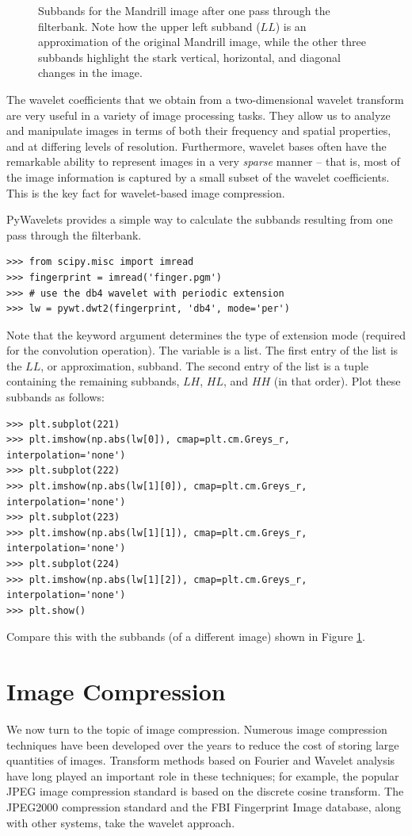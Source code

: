 \begin{figure}
\begin{subfigure}{0.4\textwidth}
       \end{subfigure}
    \caption{Subbands for the Mandrill image after one pass through the filterbank.
    Note how the upper left subband ($LL$) is an approximation of the original Mandrill image, while the other
    three subbands highlight the stark vertical, horizontal, and diagonal changes in the image.}
    \label{fig:dwt2D}
\end{figure}

The wavelet coefficients that we obtain from a two-dimensional wavelet transform are very useful in a variety of image processing tasks.
They allow us to analyze and manipulate images in terms of both their
frequency and spatial properties, and at differing levels of resolution.
Furthermore, wavelet bases often have the remarkable ability to represent
images in a very \textit{sparse} manner -- that is, most of the image
information is captured by a small subset of the wavelet coefficients.
This is the key fact for wavelet-based image compression.

PyWavelets provides a simple way to calculate the subbands resulting from one pass through the filterbank.
\begin{lstlisting}
>>> from scipy.misc import imread
>>> fingerprint = imread('finger.pgm')
>>> # use the db4 wavelet with periodic extension
>>> lw = pywt.dwt2(fingerprint, 'db4', mode='per')
\end{lstlisting}
Note that the  keyword argument determines the type of extension mode (required for the convolution
operation).
The variable  is a list. The first entry of the list is the $LL$, or approximation, subband.
The second entry of the list is a tuple containing the remaining subbands, $LH$, $HL$, and $HH$ (in that order).
Plot these subbands as follows:
\begin{lstlisting}
>>> plt.subplot(221)
>>> plt.imshow(np.abs(lw[0]), cmap=plt.cm.Greys_r, interpolation='none')
>>> plt.subplot(222)
>>> plt.imshow(np.abs(lw[1][0]), cmap=plt.cm.Greys_r, interpolation='none')
>>> plt.subplot(223)
>>> plt.imshow(np.abs(lw[1][1]), cmap=plt.cm.Greys_r, interpolation='none')
>>> plt.subplot(224)
>>> plt.imshow(np.abs(lw[1][2]), cmap=plt.cm.Greys_r, interpolation='none')
>>> plt.show()
\end{lstlisting}
Compare this with the subbands (of a different image) shown in Figure \ref{fig:dwt2D}.

\section*{Image Compression}
We now turn to the topic of image compression.
Numerous image compression techniques
have been developed over the years to reduce the cost of storing large quantities of images.
Transform methods based on Fourier and Wavelet analysis
have long played an important role in these techniques;
for example, the popular JPEG image compression standard is based on
the discrete cosine transform.
The JPEG2000 compression standard and the FBI Fingerprint Image database, along with other systems,
take the wavelet approach.

